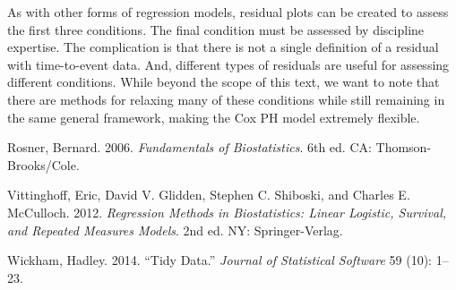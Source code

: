 \documentclass[
]{book}
\theoremstyle{plain}
\theoremstyle{mydefn}
\theoremstyle{myexmpl}
\theoremstyle{remark}
\begin{document}
As with other forms of regression models, residual plots can be created to assess the first three conditions. The final condition must be assessed by discipline expertise. The complication is that there is not a single definition of a residual with time-to-event data. And, different types of residuals are useful for assessing different conditions. While beyond the scope of this text, we want to note that there are methods for relaxing many of these conditions while still remaining in the same general framework, making the Cox PH model extremely flexible.

\hypertarget{refs}{}
\leavevmode\hypertarget{ref-Rosner2006}{}%
Rosner, Bernard. 2006. \emph{Fundamentals of Biostatistics}. 6th ed. CA: Thomson-Brooks/Cole.

\leavevmode\hypertarget{ref-Vittinghoff2012}{}%
Vittinghoff, Eric, David V. Glidden, Stephen C. Shiboski, and Charles E. McCulloch. 2012. \emph{Regression Methods in Biostatistics: Linear Logistic, Survival, and Repeated Measures Models}. 2nd ed. NY: Springer-Verlag.

\leavevmode\hypertarget{ref-Wickham2014}{}%
Wickham, Hadley. 2014. ``Tidy Data.'' \emph{Journal of Statistical Software} 59 (10): 1--23.
\end{document}
